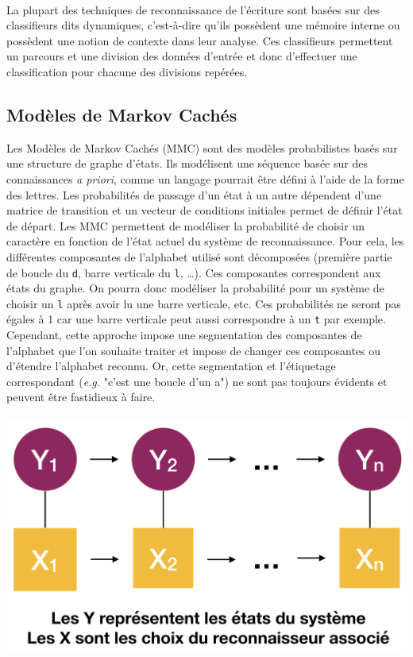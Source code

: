 \paragraph{}
La plupart des techniques de reconnaissance de l'écriture sont basées sur des classifieurs
dits dynamiques, c'est-à-dire qu'ils possèdent une mémoire interne ou possèdent une notion
de contexte dans leur analyse. Ces classifieurs permettent un parcours et une division des
données d'entrée et donc d'effectuer une classification pour chacune des divisions repérées. 
		
\subsection{Modèles de Markov Cachés}

Les Modèles de Markov Cachés (MMC) sont des modèles probabilistes basés sur une structure de
graphe d'états. Ils modélisent une séquence basée sur des connaissances \textit{a priori},
comme un langage pourrait être défini à l'aide de la forme des lettres. Les probabilités de passage
d'un état à un autre dépendent d'une matrice de transition et un vecteur de conditions initiales
permet de définir l'état de départ. Les MMC permettent de modéliser la probabilité de choisir un caractère
en fonction de l'état actuel du système de reconnaissance. Pour cela, les différentes composantes
de l'alphabet utilisé sont décomposées (première partie de boucle du \texttt{d}, barre verticale du \texttt{l}, \ldots).
Ces composantes correspondent aux états du graphe. On pourra donc modéliser la
probabilité pour un système de choisir un \texttt{l} après avoir lu une barre verticale, etc.
Ces probabilités ne seront pas égales à 1 car une barre verticale peut aussi correspondre à un
\texttt{t} par exemple. Cependant, cette approche impose une segmentation des composantes
de l'alphabet que l'on souhaite traiter et impose de changer ces composantes ou d'étendre
l'alphabet reconnu. Or, cette segmentation et l'étiquetage correspondant (\textit{e.g.} "c'est une boucle d'un a")
ne sont pas toujours évidents et peuvent être fastidieux à faire.

\paragraph{}
\begin{mdframed}[frametitle={Figure 8 : Schéma de transition et d'observation d'un MMC}, innerbottommargin=10]
\begin{center}
\includegraphics[width=0.6\linewidth]{mmc.png}
\end{center}
\end{mdframed}

